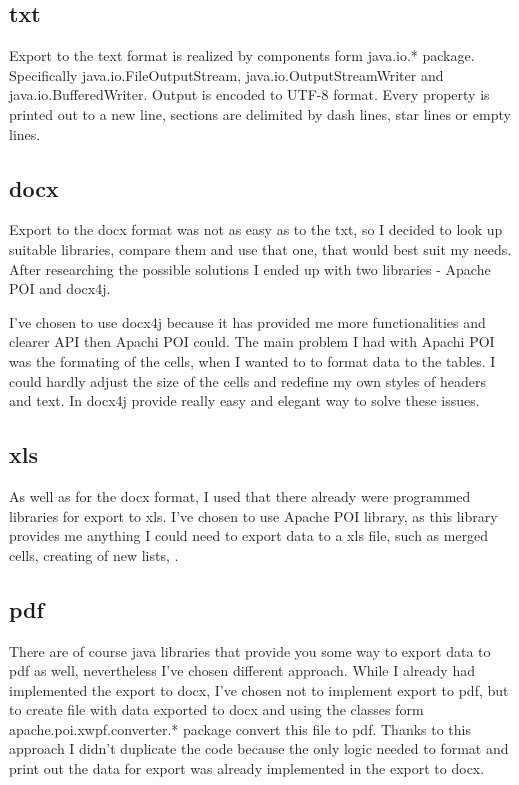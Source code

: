 \documentclass[thesis=B,english]{FITthesis}[2012/10/20]
\begin{document}
\subsection{txt}
Export to the text format is realized by components form java.io.* package. Specifically java.io.FileOutputStream, java.io.OutputStreamWriter and java.io.BufferedWriter. Output is encoded to UTF-8 format. Every property is printed out to a new line, sections are delimited by dash lines, star lines or empty lines.
\subsection{docx}
Export to the docx format was not as easy as to the txt, so I decided to look up suitable libraries, compare them and use that one, that would best suit my needs. After researching the possible solutions I ended up with two libraries - Apache POI and docx4j.

I've chosen to use docx4j because it has provided me more functionalities and clearer API then Apachi POI could. The main problem I had with Apachi POI was the formating of the cells, when I wanted to to format data to the tables. I could hardly adjust the size of the cells and redefine my own styles of headers and text. In docx4j provide really easy and elegant way to solve these issues.
\subsection{xls}
As well as for the docx format, I used that there already were programmed libraries for export to xls.
I've chosen to use Apache POI library, as this library provides me anything I could need to export data to  a xls file, such as merged cells, creating of new lists, .
\subsection{pdf}
There are of course java libraries that provide you some way to export data to pdf as well, nevertheless I've chosen different approach. While I already had implemented the export to docx, I've chosen not to implement export to pdf, but to create file with data exported to docx and using the classes form apache.poi.xwpf.converter.* package convert this file to pdf. Thanks to this approach I didn't duplicate the code because the only logic needed to format and print out the data for export was already implemented in the export to docx. 
\end{document}
